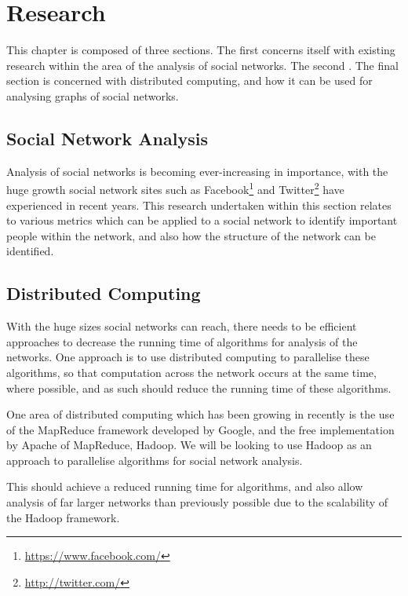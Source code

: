 \chapter{Research}
This chapter is composed of three sections. The first concerns itself with existing research within the area of the analysis of social networks. The second . The final section is concerned with distributed computing, and how it can be used for analysing graphs of social networks.


\section{Social Network Analysis}
Analysis of social networks is becoming ever-increasing in importance, with the huge growth social network sites such as Facebook\footnote{\url{https://www.facebook.com/}} and Twitter\footnote{\url{http://twitter.com/}} have experienced in recent years. This research undertaken within this section relates to various metrics which can be applied to a social network to identify important people within the network, and also how the structure of the network can be identified.








\section{Distributed Computing}
With the huge sizes social networks can reach, there needs to be efficient approaches to decrease the running time of algorithms for analysis of the networks. One approach is to use distributed computing to parallelise these algorithms, so that computation across the network occurs at the same time, where possible, and as such should reduce the running time of these algorithms.

One area of distributed computing which has been growing in recently is the use of the MapReduce framework developed by Google, and the free implementation by Apache of MapReduce, Hadoop. We will be looking to use Hadoop as an approach to parallelise algorithms for social network analysis.

This should achieve a reduced running time for algorithms, and also allow analysis of far larger networks than previously possible due to the scalability of the Hadoop framework.



